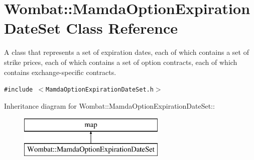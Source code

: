\hypertarget{classWombat_1_1MamdaOptionExpirationDateSet}{
\section{Wombat::Mamda\-Option\-Expiration\-Date\-Set Class Reference}
\label{classWombat_1_1MamdaOptionExpirationDateSet}
}
A class that represents a set of expiration dates, each of which contains a set of strike prices, each of which contains a set of option contracts, each of which contains exchange-specific contracts.  


{\tt \#include $<$Mamda\-Option\-Expiration\-Date\-Set.h$>$}

Inheritance diagram for Wombat::Mamda\-Option\-Expiration\-Date\-Set::\begin{figure}[H]
\begin{center}
\leavevmode
\includegraphics[height=2cm]{classWombat_1_1MamdaOptionExpirationDateSet}
\end{center}
\end{figure}
